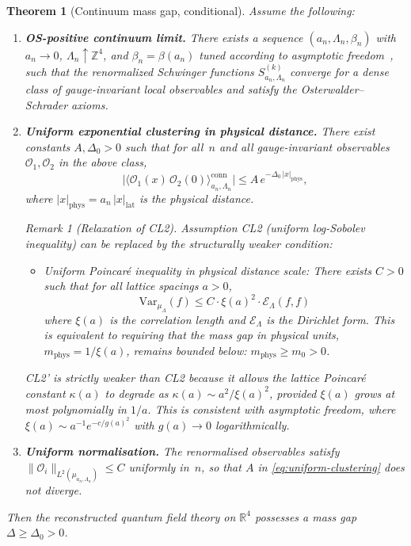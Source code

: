 \documentclass[12pt,a4paper]{article}
\theoremstyle{definition}
\theoremstyle{plain}
\newtheorem{theorem}[definition]{Theorem}
\theoremstyle{remark}
\newtheorem{remark}[definition]{Remark}
\begin{document}
\begin{theorem}[Continuum mass gap, conditional]
\label{thm:continuum-gap}
Assume the following:
\begin{enumerate}
    \item[\textup{(CL1)}] \textbf{OS-positive continuum limit.}  There exists a sequence $(a_n, \Lambda_n, \beta_n)$ with $a_n \to 0$, $\Lambda_n \uparrow \mathbb{Z}^4$, and $\beta_n = \beta(a_n)$ tuned according to asymptotic freedom~\cite{GrossWilczek1973,Politzer1973}, such that the renormalized Schwinger functions $S^{(k)}_{a_n,\Lambda_n}$ converge for a dense class of gauge-invariant local observables and satisfy the Osterwalder--Schrader axioms.
    \item[\textup{(CL2)}] \textbf{Uniform exponential clustering in physical distance.}  There exist constants $A, \Delta_0 > 0$ such that for all~$n$ and all gauge-invariant observables $\mathcal{O}_1, \mathcal{O}_2$ in the above class,
    \begin{equation}\label{eq:uniform-clustering}
        \bigl|\langle \mathcal{O}_1(x)\,\mathcal{O}_2(0)\rangle_{a_n,\Lambda_n}^{\mathrm{conn}}\bigr|
        \leq A\,e^{-\Delta_0\,|x|_{\mathrm{phys}}},
    \end{equation}
    where $|x|_{\mathrm{phys}} = a_n\,|x|_{\mathrm{lat}}$ is the physical distance.

\begin{remark}[Relaxation of CL2]
\label{rem:cl2-relaxation}
Assumption CL2 (uniform log-Sobolev inequality) can be replaced by the structurally weaker condition:
\begin{itemize}
\item[\textbf{CL2'.}] \emph{Uniform Poincar\'e inequality in physical distance scale:} There exists $C > 0$ such that for all lattice spacings $a > 0$,
\[
\mathrm{Var}_{\mu_\Lambda}(f) \leq C \cdot \xi(a)^2 \cdot \mathcal{E}_\Lambda(f, f)
\]
where $\xi(a)$ is the correlation length and $\mathcal{E}_\Lambda$ is the Dirichlet form. This is equivalent to requiring that the mass gap in physical units, $m_{\mathrm{phys}} = 1/\xi(a)$, remains bounded below: $m_{\mathrm{phys}} \geq m_0 > 0$.
\end{itemize}
CL2' is strictly weaker than CL2 because it allows the lattice Poincar\'e constant $\kappa(a)$ to degrade as $\kappa(a) \sim a^2/\xi(a)^2$, provided $\xi(a)$ grows at most polynomially in $1/a$. This is consistent with asymptotic freedom, where $\xi(a) \sim a^{-1} e^{-c/g(a)^2}$ with $g(a) \to 0$ logarithmically.
\end{remark}

    \item[\textup{(CL3)}] \textbf{Uniform normalisation.}  The renormalised observables satisfy $\|\mathcal{O}_i\|_{L^2(\mu_{a_n,\Lambda_n})} \leq C$ uniformly in~$n$, so that $A$ in \eqref{eq:uniform-clustering} does not diverge.
\end{enumerate}
Then the reconstructed quantum field theory on $\mathbb{R}^4$ possesses a mass gap $\Delta \geq \Delta_0 > 0$.
\end{theorem}
\end{document}
